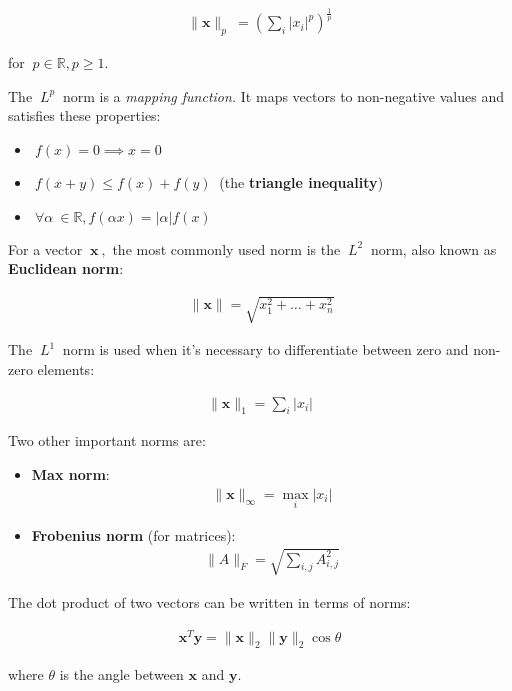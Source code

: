 \documentclass[12pt]{article}
\begin{document}
\begin{align}
\|\mathbf{x}\|_{p} \  = \left( \sum_i \left| x_i \right| ^p \right) ^ {\frac {1}{p}}
\end{align}

for $\ p \in \mathbb{R}, p \ge 1. \ $

The $\ L^{p}\ $ norm is a \textit{mapping function.} It maps vectors to non-negative values and satisfies these properties:

\begin{itemize}
    \item $\ f(x) = 0 \implies x = 0 \ $
    \item $\ f(x+y) \le f(x) + f(y)\ $ (the \textbf{triangle inequality})
    \item $\ \forall \alpha \ \in \mathbb{R}, f(\alpha x) = \left| \alpha \right|f(x) \ $
\end{itemize}

For a vector $\ \mathbf{x} \ ,$ the most commonly used norm is the $\ L^{2} \ $ norm, also known as \textbf{Euclidean norm}:

\begin{align}
\ \|\mathbf{x}\| = \sqrt{x_1^2 + \dots + x_n^2}
\end{align}

The $\ L^{1} \ $ norm is used when it's necessary to differentiate between zero and non-zero elements:

\begin{align}
\|\mathbf{x}\|_{1} = \sum_{i} \left|x_{i}\right|
\end{align}

Two other important norms are:

\begin{itemize}
    \item \textbf{Max norm}:
    \begin{align}
    \|\mathbf{x}\|_{\infty} = \max_{i} \left|x_{i}\right|
    \end{align}
    \item \textbf{Frobenius norm} (for matrices):
    \begin{align}
    \|A\|_{F} = \sqrt{\sum_{i,j}A^{2}_{i,j}}
    \end{align}
\end{itemize}

The dot product of two vectors can be written in terms of norms:

\begin{align}
\mathbf{x}^{T}\mathbf{y} = \|\mathbf{x}\|_{2}\|\mathbf{y}\|_{2}\cos\theta
\end{align}

where $\theta$ is the angle between $\mathbf{x}$ and $\mathbf{y}$.
\end{document}

